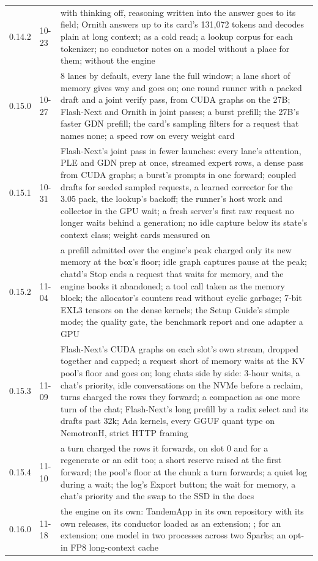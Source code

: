 \begin{table}[htbp]
\begin{tabularx}{\linewidth}{@{}L{.2\linewidth}L{.15\linewidth}Y@{}}
0.14.2 & 10-23 & with thinking off, reasoning written into the answer goes to its field; Ornith answers up to its card's 131,072 tokens and decodes plain at long context;  as a cold read; a lookup corpus for each tokenizer; no conductor notes on a model without a place for them;  without the engine \\
0.15.0 & 10-27 & 8 lanes by default, every lane the full window; a lane short of memory gives way and goes on; one round runner with a packed draft and a joint verify pass, from CUDA graphs on the 27B; Flash-Next and Ornith in joint passes; a burst prefill; the 27B's faster GDN prefill; the card's sampling filters for a request that names none; a speed row on every weight card \\
0.15.1 & 10-31 & Flash-Next's joint pass in fewer launches: every lane's attention, PLE and GDN prep at once, streamed expert rows, a dense pass from CUDA graphs; a burst's prompts in one forward; coupled drafts for seeded sampled requests, a learned corrector for the 3.05 pack, the lookup's backoff; the runner's host work and collector in the GPU wait; a fresh server's first raw request no longer waits behind a generation; no idle capture below its state's context class; weight cards measured on  \\
0.15.2 & 11-04 & a prefill admitted over the engine's peak charged only its new memory at the box's floor; idle graph captures pause at the peak; chatd's Stop ends a request that waits for memory, and the engine books it abandoned; a  tool call taken as the memory block; the allocator's counters read without cyclic garbage; 7-bit EXL3 tensors on the dense kernels; the Setup Guide's simple mode; the quality gate, the benchmark report and one adapter a GPU \\
0.15.3 & 11-09 & Flash-Next's CUDA graphs on each slot's own stream, dropped together and capped; a request short of memory waits at the KV pool's floor and goes on; long chats side by side: 3-hour waits, a chat's priority, idle conversations on the NVMe before a reclaim, turns charged the rows they forward; a compaction as one more turn of the chat; Flash-Next's long prefill by a radix select and its drafts past 32k; Ada kernels, every GGUF quant type on NemotronH, strict HTTP framing \\
0.15.4 & 11-10 & a turn charged the rows it forwards, on slot 0 and for a regenerate or an edit too; a short reserve raised at the first forward; the pool's floor at the chunk a turn forwards; a quiet log during a wait; the log's Export button; the wait for memory, a chat's priority and the swap to the SSD in the docs \\
0.16.0 & 11-18 & the engine on its own: TandemApp in its own repository with its own releases, its conductor loaded as an extension; ;  for an extension; one model in two processes across two Sparks; an opt-in FP8 long-context cache \\
\bottomrule
\end{tabularx}
\end{table}

